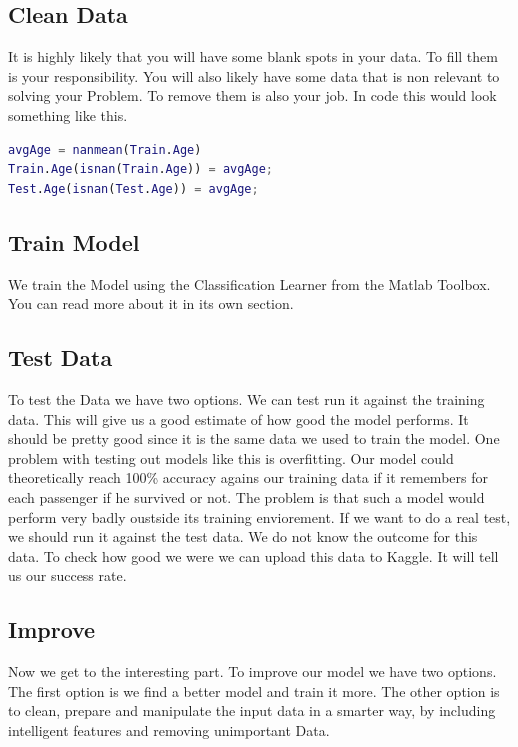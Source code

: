\documentclass[
   10.5pt,
   invert-title=true,
   titlepage=false,
   titleimage-ratio=13,
   class=article
]{bfhpub}				%
\begin{document}
\subsection*{Clean Data}
It is highly likely that you will have some blank spots in your data. To fill them is your responsibility. You will also likely have some data that is non relevant to solving your Problem. To remove them is also your job. In code this would look something like this.

\begin{lstlisting}[language=Matlab]
avgAge = nanmean(Train.Age)          
Train.Age(isnan(Train.Age)) = avgAge;  
Test.Age(isnan(Test.Age)) = avgAge;    
\end{lstlisting}

\subsection*{Train Model}
We train the Model using the Classification Learner from the Matlab Toolbox. You can read more about it in its own section. 
 
\subsection*{Test Data}
To test the Data we have two options. We can test run it against the training data. This will give us a good estimate of how good the model performs. It should be pretty good since it is the same data we used to train the model. One problem with testing out models like this is overfitting. Our model could theoretically reach 100\% accuracy agains our training data if it remembers for each passenger if he survived or not. The problem is that such a model would perform very badly oustside its training enviorement. If we want to do a real test, we should run it against the test data. We do not know the outcome for this data. To check how good we were we can upload this data to Kaggle. It will tell us our success rate. 

\subsection*{Improve}
Now we get to the interesting part. To improve our model we have two options. The first option is we find a better model and train it more. The other option is to clean, prepare and manipulate the input data in a smarter way, by including intelligent features and removing unimportant Data.
\end{document}

